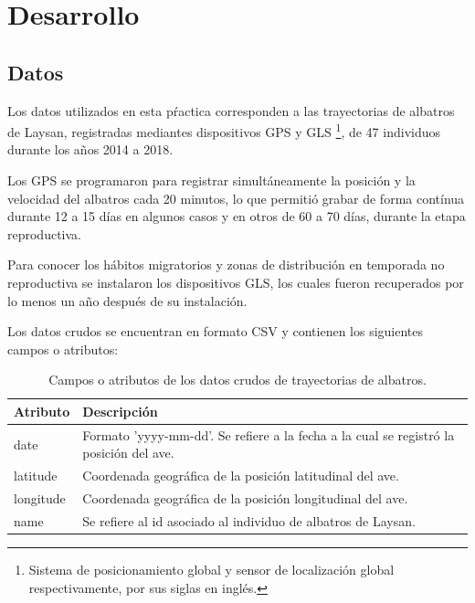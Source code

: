 
\section{Desarrollo}


\clearpage
\subsection{Datos}

Los datos utilizados en esta pŕactica corresponden a las trayectorias de
albatros de Laysan, registradas mediantes dispositivos GPS y GLS
\footnote{Sistema de posicionamiento global y sensor de localización global
respectivamente, por sus siglas en inglés.}, de 47 individuos durante los años
2014 a 2018.

Los GPS se programaron para registrar simultáneamente la posición y la velocidad
del albatros cada 20 minutos, lo que permitió grabar de forma contínua durante
12 a 15 días en algunos casos y en otros de 60 a 70 días, durante la etapa
reproductiva.

Para conocer los hábitos migratorios y zonas de distribución en temporada no
reproductiva se instalaron los dispositivos GLS, los cuales fueron recuperados
por lo menos un año después de su instalación.

Los datos crudos se encuentran en formato CSV y contienen los siguientes campos
o atributos:

\begin{table}[h]
\caption{Campos o atributos de los datos crudos de trayectorias de albatros.}
\begin{center}
    \begin{tabular}{ l  m{7cm} }
        \hline
        Atributo & Descripción \\
        \hline
        date & Formato 'yyyy-mm-dd'. Se refiere a la fecha a la cual se registró
        la posición del ave. \\
        \hline
        latitude & Coordenada geográfica de la posición latitudinal del ave. \\
        \hline
        longitude & Coordenada geográfica de la posición longitudinal del ave.
        \\
        \hline
        name & Se refiere al id asociado al individuo de albatros de Laysan.\\
        \hline
    \end{tabular}
\end{center}
\end{table}

